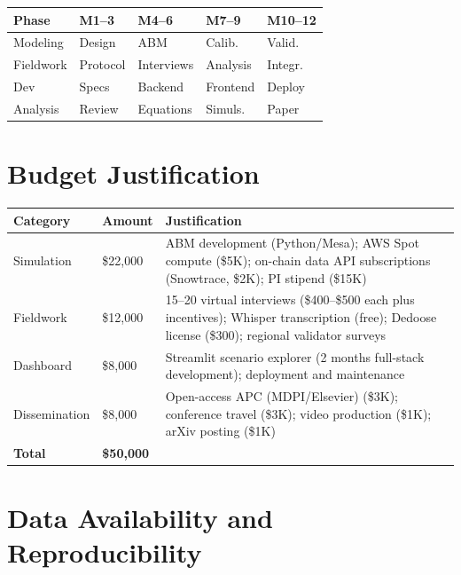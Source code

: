 \documentclass[11pt,a4paper]{article}
\begin{document}
\begin{table}[H]
\centering
\begin{tabular}{p{1.5cm} p{2.2cm} p{2.2cm} p{2.2cm} p{2.2cm}}
\toprule
\textbf{Phase} & \textbf{M1--3} & \textbf{M4--6} & \textbf{M7--9} & \textbf{M10--12} \\
\midrule
Modeling & Design & ABM & Calib. & Valid. \\
Fieldwork & Protocol & Interviews & Analysis & Integr. \\
Dev & Specs & Backend & Frontend & Deploy \\
Analysis & Review & Equations & Simuls. & Paper \\
\bottomrule
\end{tabular}
\end{table}

\section{Budget Justification}

\begin{table}[H]
\centering
\begin{tabular}{p{3cm} p{1.3cm} p{8cm}}
\toprule
\textbf{Category} & \textbf{Amount} & \textbf{Justification} \\
\midrule
Simulation & \$22,000 & ABM development (Python/Mesa); AWS Spot compute (\$5K); on-chain data API subscriptions (Snowtrace, \$2K); PI stipend (\$15K) \\
Fieldwork & \$12,000 & 15--20 virtual interviews (\$400--\$500 each plus incentives); Whisper transcription (free); Dedoose license (\$300); regional validator surveys \\
Dashboard & \$8,000 & Streamlit scenario explorer (2 months full-stack development); deployment and maintenance \\
Dissemination & \$8,000 & Open-access APC (MDPI/Elsevier) (\$3K); conference travel (\$3K); video production (\$1K); arXiv posting (\$1K) \\
\textbf{Total} & \textbf{\$50,000} & \\
\bottomrule
\end{tabular}
\end{table}

\section{Data Availability and Reproducibility}
\end{document}
